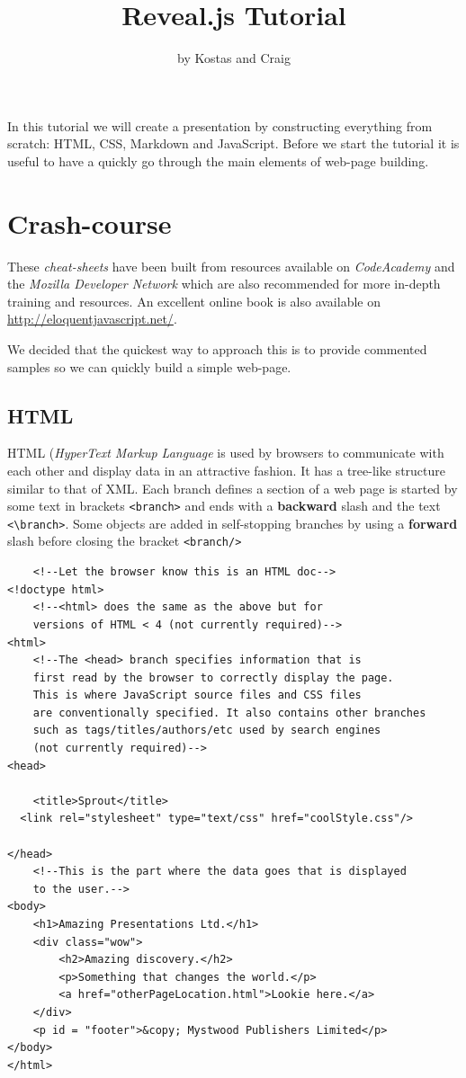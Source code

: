 \documentclass[11pt,a4paper,final]{article}
\begin{document}
\title{Reveal.js Tutorial}
\author{by Kostas and Craig}
\maketitle

In this tutorial we will create a presentation by constructing everything from scratch: HTML, CSS, Markdown and JavaScript.
Before we start the tutorial it is useful to have a quickly go through the main elements of web-page building.

\section{Crash-course}
These \textit{cheat-sheets} have been built from resources available on \emph{CodeAcademy} and the \emph{Mozilla Developer Network} which are also recommended for more in-depth training and resources. An excellent online book is also available on \url{http://eloquentjavascript.net/}.

We decided that the quickest way to approach this is to provide commented samples so we can quickly build a simple web-page.

\subsection{HTML}
HTML (\emph{HyperText Markup Language} is used by browsers to communicate with each other and display data in an attractive fashion. It has a tree-like structure similar to that of XML. Each branch defines a section of a web page is started by some text in brackets \texttt{<branch>} and ends with a \textbf{backward} slash and the text \verb|<\branch>|. Some objects are added in self-stopping branches by using a \textbf{forward} slash before closing the bracket \texttt{<branch/>}

\begin{verbatim}
	<!--Let the browser know this is an HTML doc-->
<!doctype html> 
	<!--<html> does the same as the above but for 
	versions of HTML < 4 (not currently required)-->
<html> 
	<!--The <head> branch specifies information that is 
	first read by the browser to correctly display the page.
	This is where JavaScript source files and CSS files
	are conventionally specified. It also contains other branches
	such as tags/titles/authors/etc used by search engines
	(not currently required)-->
<head>

	<title>Sprout</title>
  <link rel="stylesheet" type="text/css" href="coolStyle.css"/>

</head>
	<!--This is the part where the data goes that is displayed
	to the user.-->
<body>
	<h1>Amazing Presentations Ltd.</h1>
	<div class="wow">
		<h2>Amazing discovery.</h2>
		<p>Something that changes the world.</p>
		<a href="otherPageLocation.html">Lookie here.</a>
	</div>
	<p id = "footer">&copy; Mystwood Publishers Limited</p>
</body>
</html>

\end{verbatim}
\end{document}
